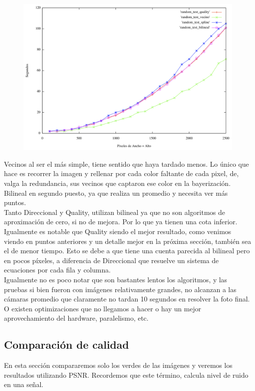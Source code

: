 {\begin{figure}[h]
       \includegraphics[width=1\textwidth]{imagenes/tiempo_algoritmos_random.png}
\end{figure}

Vecinos al ser el más simple, tiene sentido que haya tardado menos. Lo único que hace es recorrer la imagen y rellenar por cada color faltante de cada pixel, de, valga la redundancia, sus vecinos que captaron ese color en la bayerización. Bilineal en segundo puesto, ya que realiza un promedio y necesita ver más puntos. \\
Tanto Direccional y Quality, utilizan bilineal ya que no son algoritmos de aproximación de cero, si no de mejora. Por lo que ya tienen una cota inferior. Igualmente es notable que Quality siendo el mejor resultado, como venimos viendo en puntos anteriores y un detalle mejor en la próxima sección, también sea el de menor tiempo. Esto se debe a que tiene una cuenta parecida al bilineal pero en pocos píxeles, a diferencia de Direccional que resuelve un sistema de ecuaciones por cada fila y columna.\\
Igualmente no es poco notar que son bastantes lentos los algoritmos, y las pruebas si bien fueron con imágenes relativamente grandes, no alcanzan a las cámaras promedio que claramente no tardan 10 segundos en resolver la foto final. O existen optimizaciones que no llegamos a hacer o hay un mejor aprovechamiento del hardware, paralelismo, etc.



\subsection{Comparación de calidad}
En esta sección compararemos solo los verdes de las imágenes y veremos los resultados utilizando PSNR. Recordemos que este término, calcula nivel de ruido en una señal.

}
